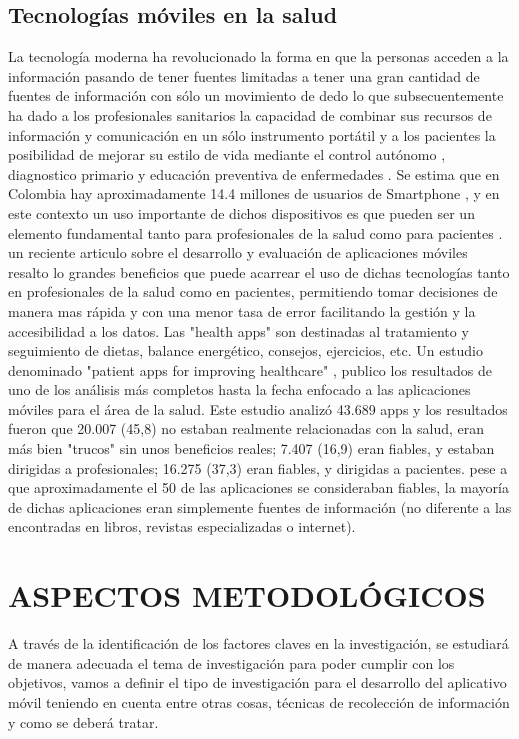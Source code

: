 \documentclass[a4paper,man,natbib]{apa6}
\begin{document}
\subsection{Tecnologías móviles en la salud}
La tecnología moderna ha revolucionado la forma en que la personas acceden a la información pasando de tener fuentes limitadas a tener una gran cantidad de fuentes de información con sólo un movimiento de dedo lo que subsecuentemente ha dado a los profesionales sanitarios la capacidad de combinar sus recursos de información y comunicación en un sólo instrumento portátil y a los pacientes la posibilidad de mejorar su estilo de vida mediante el control autónomo , diagnostico primario y educación preventiva de enfermedades\cite{o17} . Se estima que en Colombia hay aproximadamente 14.4 millones de usuarios de Smartphone \cite{o18} , y en este contexto un uso importante de dichos dispositivos es que pueden ser un elemento fundamental tanto para profesionales de la salud como para pacientes . un reciente articulo sobre el desarrollo y evaluación de aplicaciones móviles resalto lo grandes beneficios que puede acarrear el uso de dichas tecnologías tanto en profesionales de la salud como en pacientes, permitiendo tomar decisiones de manera mas rápida y con una menor tasa de error facilitando la gestión y la accesibilidad a los datos. Las "health apps" son destinadas al tratamiento y seguimiento de  dietas, balance energético, consejos, ejercicios, etc. Un estudio denominado  "patient apps for improving healthcare" \cite{o19}, publico los resultados de uno de los análisis más completos hasta la fecha enfocado a las aplicaciones móviles para el área de la salud. Este estudio analizó 43.689 apps y los resultados fueron que 20.007 (45,8) no estaban realmente relacionadas con la salud, eran más bien "trucos" sin unos beneficios reales; 7.407 (16,9) eran fiables, y estaban dirigidas a profesionales; 16.275 (37,3) eran fiables, y dirigidas a pacientes. pese a que aproximadamente el 50 de las aplicaciones se consideraban fiables, la mayoría de dichas aplicaciones eran simplemente  fuentes de información (no diferente a las encontradas en libros, revistas especializadas o internet).



\section{ASPECTOS METODOLÓGICOS}
A través de la identificación de los factores claves en la investigación, se estudiará de manera adecuada el tema de investigación para poder cumplir con los objetivos, vamos a definir  el tipo de investigación para el desarrollo del aplicativo móvil teniendo en cuenta entre otras cosas, técnicas de recolección de información y como se deberá tratar.
\end{document}

